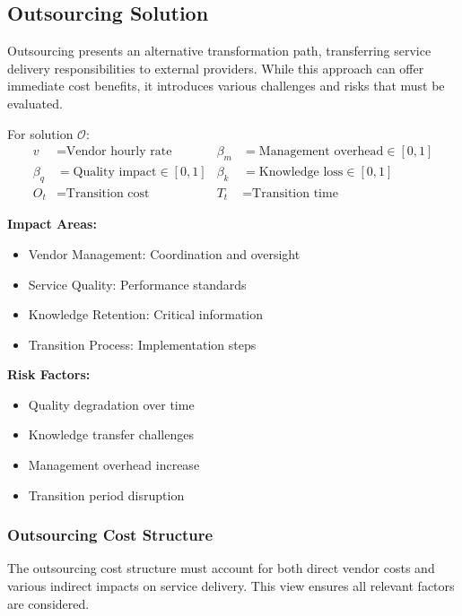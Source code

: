 \documentclass[12pt,a4paper]{article}
\newenvironment{definition}[1]
{\begin{mdframed}[style=definitionstyle,frametitle={Definition: #1}]}
{\end{mdframed}}
\newenvironment{explanation}
{\begin{mdframed}[style=explanationstyle,frametitle={Explanation}]}
{\end{mdframed}}
\begin{document}
\subsection{Outsourcing Solution}
Outsourcing presents an alternative transformation path, transferring service delivery responsibilities to external providers. While this approach can offer immediate cost benefits, it introduces various challenges and risks that must be evaluated.

\begin{definition}{Outsourcing Variables}
For solution $\mathcal{O}$:
\begin{align*}
    v &= \text{Vendor hourly rate} & \beta_m &= \text{Management overhead} \in [0,1] \\
    \beta_q &= \text{Quality impact} \in [0,1] & \beta_k &= \text{Knowledge loss} \in [0,1] \\
    O_t &= \text{Transition cost} & T_t &= \text{Transition time}
\end{align*}
\end{definition}

\begin{explanation}
\textbf{Impact Areas:}
\begin{itemize}
    \item Vendor Management: Coordination and oversight
    \item Service Quality: Performance standards
    \item Knowledge Retention: Critical information
    \item Transition Process: Implementation steps
\end{itemize}
\textbf{Risk Factors:}
\begin{itemize}
    \item Quality degradation over time
    \item Knowledge transfer challenges
    \item Management overhead increase
    \item Transition period disruption
\end{itemize}
\end{explanation}

\subsubsection{Outsourcing Cost Structure}
The outsourcing cost structure must account for both direct vendor costs and various indirect impacts on service delivery. This view ensures all relevant factors are considered.
\end{document}
